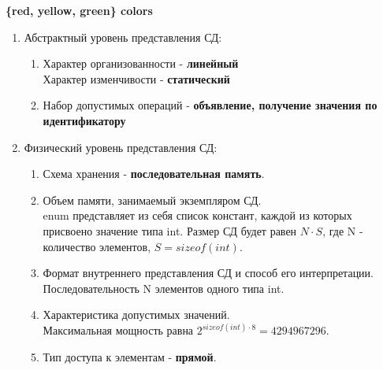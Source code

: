 \documentclass[a4paper,14pt]{extarticle}
\begin{document}
\begin{enumerate}
	      \textbf{\{red, yellow, green\} colors}
	      \begin{enumerate}[label*=\arabic*.]
		      \item Абстрактный уровень представления СД:

		            \begin{enumerate}[label*=\arabic*.]
			            \item Характер организованности - \textbf{линейный}\\
			                  Характер изменчивости - \textbf{статический}
			            \item Набор допустимых операций - \textbf{объявление, получение значения по идентификатору}
		            \end{enumerate}

		      \item Физический уровень представления СД:

		            \begin{enumerate}[label*=\arabic*.]
			            \item Схема хранения - \textbf{последовательная память}.
			            \item Объем памяти, занимаемый экземпляром СД.\\
			                  enum представляет из себя список констант, каждой из которых присвоено
			                  значение типа int. Размер СД будет равен $N\cdot S$, где N - количество элементов, $S = sizeof(int)$.
			            \item Формат внутреннего представления СД и способ его интерпретации.\\
			                  Последовательность N элементов одного типа int.
			            \item Характеристика допустимых значений.\\
			                  Максимальная мощность равна $2 ^ {sizeof(int) \cdot 8} = 4294967296$.
			            \item Тип доступа к элементам - \textbf{прямой}.
		            \end{enumerate}


\end{enumerate}
\end{enumerate}
\end{document}
